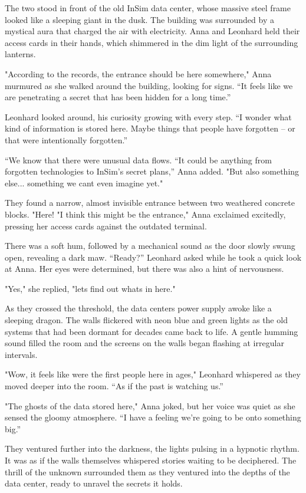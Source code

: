 \documentclass[
]{article}
\begin{document}
The two stood in front of the old InSim data center, whose massive steel
frame looked like a sleeping giant in the dusk. The building was
surrounded by a mystical aura that charged the air with electricity.
Anna and Leonhard held their access cards in their hands, which
shimmered in the dim light of the surrounding lanterns.

"According to the records, the entrance should be here somewhere," Anna
murmured as she walked around the building, looking for signs. ``It
feels like we are penetrating a secret that has been hidden for a long
time.''

Leonhard looked around, his curiosity growing with every step. ``I
wonder what kind of information is stored here. Maybe things that people
have forgotten -- or that were intentionally forgotten.''

``We know that there were unusual data flows. ``It could be anything
from forgotten technologies to InSim's secret plans,'' Anna added. "But
also something else... something we can\textquotesingle t even imagine
yet."

They found a narrow, almost invisible entrance between two weathered
concrete blocks. "Here! "I think this might be the entrance," Anna
exclaimed excitedly, pressing her access cards against the outdated
terminal.

There was a soft hum, followed by a mechanical sound as the door slowly
swung open, revealing a dark maw. ``Ready?'' Leonhard asked while he
took a quick look at Anna. Her eyes were determined, but there was also
a hint of nervousness.

"Yes," she replied, "let\textquotesingle s find out
what\textquotesingle s in here."

As they crossed the threshold, the data center\textquotesingle s power
supply awoke like a sleeping dragon. The walls flickered with neon blue
and green lights as the old systems that had been dormant for decades
came back to life. A gentle humming sound filled the room and the
screens on the walls began flashing at irregular intervals.

"Wow, it feels like we\textquotesingle re the first people here in
ages," Leonhard whispered as they moved deeper into the room. ``As if
the past is watching us.''

"The ghosts of the data stored here," Anna joked, but her voice was
quiet as she sensed the gloomy atmosphere. ``I have a feeling we're
going to be onto something big.''

They ventured further into the darkness, the lights pulsing in a
hypnotic rhythm. It was as if the walls themselves whispered stories
waiting to be deciphered. The thrill of the unknown surrounded them as
they ventured into the depths of the data center, ready to unravel the
secrets it holds.
\end{document}
